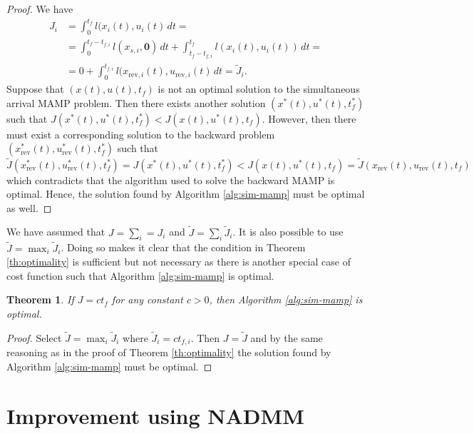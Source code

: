 \documentclass[letterpaper, 10 pt, conference]{ieeeconf}  %
\newtheorem{theorem}{Theorem}
\begin{document}
\begin{proof}
We have
\begin{equation}
\begin{aligned}
J_i &= \int_{0}^{t_f} l(x_i(t), u_i(t) \, dt = \\
&= \int_{0}^{t_f-t_{f, i}} l(x_{s, i}, \mathbf{0}) \, dt + \int_{t_f-t_{f, i}}^{t_f} l(x_i(t), u_i(t)) \, dt = \\
&=  0 + \int_{0}^{t_{f, i}} l(x_{\text{rev}, i}(t), u_{\text{rev}, i}(t) \, dt = \tilde{J}_i.
\end{aligned}
\end{equation}
Suppose that $(x(t), u(t), t_f)$ is not an optimal solution to the simultaneous arrival MAMP problem. Then there exists another solution $(x^*(t), u^*(t), t_f^*)$ such that $J(x^*(t), u^*(t), t_f^*) < J(x(t), u^*(t), t_f)$. However, then there must exist a corresponding solution to the backward problem $(x^*_{\text{rev}}(t), u^*_{\text{rev}}(t), t_f^*)$ such that $\tilde{J}(x^*_{\text{rev}}(t), u^*_{\text{rev}}(t), t_f^*) = J(x^*(t), u^*(t), t_f^*) < J(x(t), u^*(t), t_f) = \tilde{J}(x_{\text{rev}}(t), u_{\text{rev}}(t), t_f)$ which contradicts that the algorithm used to solve the backward MAMP is optimal. Hence, the solution found by Algorithm \ref{alg:sim-mamp} must be optimal as well.
\end{proof}

We have assumed that $J = \sum_i= J_i$ and $\tilde{J} = \sum_i \tilde{J}_i$. It is also possible to use $\tilde{J} = \max_i \tilde{J}_i$. Doing so makes it clear that the condition in Theorem \ref{th:optimality} is sufficient but not necessary as there is another special case of cost function such that Algorithm \ref{alg:sim-mamp} is optimal. 

\begin{theorem}
If $J = ct_f$ for any constant $c > 0$, then Algorithm \ref{alg:sim-mamp} is optimal.
\end{theorem}

\begin{proof}
Select $\tilde{J} = \max_i \tilde{J}_i$ where $\tilde{J}_i = ct_{f, i}$. Then $J = \tilde{J}$ and by the same reasoning as in the proof of Theorem \ref{th:optimality} the solution found by Algorithm \ref{alg:sim-mamp} must be optimal.
\end{proof}







\section{Improvement using NADMM}
\end{document}
